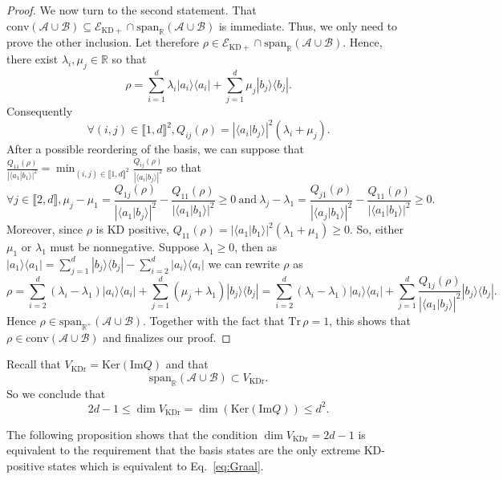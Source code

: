 \documentclass[a4paper, notitlepage, 11pt]{article}
\numberwithin{equation}{section}
\newcommand{\bra}[1]{\langle #1|}
\newcommand{\cket}[1]{|#1\rangle}
\newcommand{\bracket}[2]{\langle #1|#2\rangle}
\newcommand{\Acal}{{\mathcal A}}
\newcommand{\Bcal}{{\mathcal B}}
\newcommand{\EcalKDC}{{\mathcal E}_{\mathrm{KD+}}}
\newcommand{\spanRAB}{{\mathrm{span}_{\R}(\Acal\cup\Bcal)}}
\newcommand{\Ker}{{\mathrm{Ker}}}
\newcommand{\R}{\mathbb{R}}
\newcommand{\Tr}{\mathrm{Tr}\,}
\newcommand{\conv}[1]{\mathrm{conv}\left(#1\right)}
\newcommand{\VR}{V_{\mathrm{KDr}}}
\renewcommand{\Im}[1]{\mathrm{Im}#1}
\newcommand{\IntEnt}[2]{\llbracket #1 , #2 \rrbracket}
\newcommand{\convAB}{\conv{\Acal \cup \Bcal}}
\begin{document}
\begin{proof}
We now turn to the second statement. That $\convAB\subseteq\EcalKDC\cap \spanRAB$ is immediate. {Thus,} we only need to prove the other inclusion. 
Let therefore $\rho\in \EcalKDC\cap \spanRAB$. Hence, there exist $\lambda_i, \mu_j\in\R$ so that 
$$
\rho=\sum_{i=1}^{d} \lambda_i\cket{a_i}\bra{a_i} + \sum_{j=1}^{d} \mu_j\cket{b_j}\bra{b_j}.
$$ 
Consequently 
\[
\forall (i,j)\in\IntEnt{1}{d}^2, Q_{ij}(\rho) = \left|\bracket{a_i}{b_j}\right|^2 \left(\lambda_{i}+\mu_{j}\right).
\]
After a possible reordering of the basis, we can suppose that $\frac{Q_{11}(\rho)}{|\langle a_1|b_1\rangle|^2} = \min_{(i,j)\in\IntEnt{1}{d}^2}\frac{Q_{ij}(\rho)}{\left|\bracket{a_i}{b_j}\right|^2}$ so that 
\[
\forall j \in \IntEnt{2}{d}, \mu_j -\mu_1 =  \frac{Q_{1j}(\rho)}{\left|\bracket{a_1}{b_j}\right|^2} - \frac{Q_{11}(\rho)}{\left|\bracket{a_1}{b_1}\right|^2} \geqslant 0 \ \mathrm{and} \ \lambda_j -\lambda_1=\frac{Q_{j1}(\rho)}{\left|\bracket{a_j}{b_1}\right|^2} - \frac{Q_{11}(\rho)}{\left|\bracket{a_1}{b_1}\right|^2} \geqslant 0.
\]
Moreover, since $\rho$ is KD positive, $Q_{11}(\rho)=  \left|\bracket{a_1}{b_1}\right|^2 \left(\lambda_{1}+\mu_{1}\right) \geqslant 0$. So, either  $\mu_1$ or $\lambda_1$ must be nonnegative. Suppose $\lambda_1\geq 0$, then as $\cket{a_1}\bra{a_1} = \sum_{j=1}^{d}\cket{b_j}\bra{b_j} - \sum_{i=2}^{d}\cket{a_i}\bra{a_i}$ we can rewrite $\rho$ as 
\[
\rho = \sum_{i=2}^{d} \left(\lambda_i -\lambda_1\right)\cket{a_i}\bra{a_i} + \sum_{j=1}^{d} \left(\mu_j +\lambda_1\right)\cket{b_j}\bra{b_j} = \sum_{i=2}^{d} \left(\lambda_i -\lambda_1\right)\cket{a_i}\bra{a_i} + \sum_{j=1}^{d} \frac{Q_{1j}(\rho)}{\left|\bracket{a_1}{b_j}\right|^2}\cket{b_j}\bra{b_j}.
\]
Hence $\rho\in \mathrm{span}_{\R^+} (\Acal \cup \Bcal)$. Together with the fact that $\Tr\rho=1$, this shows that $\rho\in \convAB$ and {finalizes our}  proof.
\end{proof}
 
Recall that $\VR=\Ker(\Im{Q})$ and that 
$$
\spanRAB\subset \VR.
$$
So we conclude that 
\begin{equation}\label{eq:dimVRbounds}
2d-1\leq \dim \VR=\dim(\Ker(\Im{Q}))\leq d^2.
\end{equation}

The following proposition shows that the condition $\dim\VR=2d-1$ is equivalent to the requirement that the basis states are the only extreme KD-positive  states which is equivalent to Eq.~\eqref{eq:Graal}.\\
\end{document}
